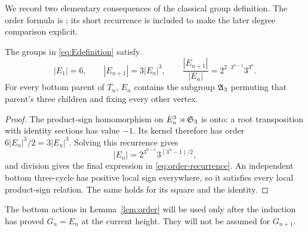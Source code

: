 We record two elementary consequences of the classical group
definition. The order formula is
\cite[Proposition~2.2]{benedetto2017cubic}; its short recurrence is
included to make the later degree comparison explicit.

\begin{lemma}\label{lem:order}
The groups in \eqref{eq:Edefinition} satisfy
\begin{equation}\label{eq:order-recurrence}
 |E_1|=6,\qquad |E_{n+1}|=3|E_n|^3,
 \qquad
 \frac{|E_{n+1}|}{|E_n|}
   =2^{2\cdot3^{n-1}}3^{3^n}.
\end{equation}
For every bottom parent of $T_n$, $E_n$ contains the subgroup
$\mathfrak{A}_3$ permuting that parent's three children and fixing every
other vertex.
\end{lemma}

\begin{proof}
The product-sign homomorphism on $E_n^3\rtimes\mathfrak{S}_3$ is onto:
a root transposition with identity sections has value $-1$.
Its kernel therefore has order $6|E_n|^3/2=3|E_n|^3$.
Solving this recurrence gives
\[
 |E_n|=2^{3^{n-1}}3^{(3^n-1)/2},
\]
and division gives the final expression in
\eqref{eq:order-recurrence}. An independent bottom three-cycle
has positive local sign everywhere, so it satisfies every local
product-sign relation. The same holds for its square and the
identity.
\end{proof}

The bottom actions in Lemma~\ref{lem:order} will be used only after
the induction has proved $G_n=E_n$ at the current height. They will
not be assumed for $G_{n+1}$.

